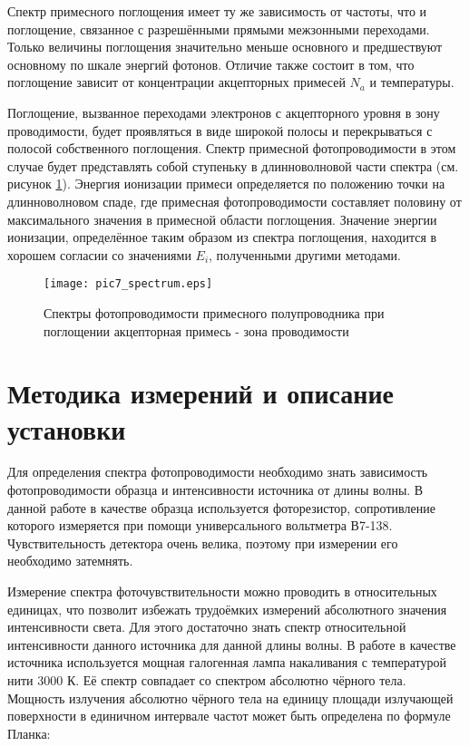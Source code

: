Спектр примесного поглощения имеет ту же зависимость от частоты, что и поглощение, связанное с разрешёнными прямыми межзонными переходами. Только величины поглощения значительно меньше основного и предшествуют основному по шкале энергий фотонов. Отличие также состоит в том, что поглощение зависит от концентрации акцепторных примесей $N_{a}$ и температуры.

Поглощение, вызванное переходами электронов с акцепторного уровня в зону проводимости, будет проявляться в виде широкой полосы и перекрываться с полосой собственного поглощения. Спектр примесной фотопроводимости в этом случае будет представлять собой ступеньку в длинноволновой части спектра (см. рисунок \ref{pic7_spectrum}). Энергия ионизации примеси определяется по положению точки на длинноволновом спаде, где примесная фотопроводимости составляет половину от максимального значения в примесной области поглощения. Значение энергии ионизации, определённое таким образом из спектра поглощения, находится в хорошем согласии со значениями $E_{i}$, полученными другими методами.

\begin{figure}[h!]\centering
\texttt{[image: pic7\_spectrum.eps]}
\caption{Спектры фотопроводимости примесного полупроводника при поглощении акцепторная примесь - зона проводимости}
\label{pic7_spectrum}
\end{figure}

\section{Методика измерений и описание установки}
Для определения спектра фотопроводимости необходимо знать зависимость фотопроводимости образца и интенсивности источника от длины волны. В данной работе в качестве образца используется фоторезистор, сопротивление которого измеряется при помощи универсального вольтметра В7-138. Чувствительность детектора очень велика, поэтому при измерении его необходимо затемнять.

Измерение спектра фоточувствительности можно проводить в относительных единицах, что позволит избежать трудоёмких измерений абсолютного значения интенсивности света. Для этого достаточно знать спектр относительной интенсивности данного источника для данной длины волны. В работе в качестве источника используется мощная галогенная лампа накаливания с температурой нити 3000 К. Её спектр совпадает со спектром абсолютно чёрного тела. Мощность излучения абсолютно чёрного тела на единицу площади излучающей поверхности в единичном интервале частот может быть определена по формуле Планка:

